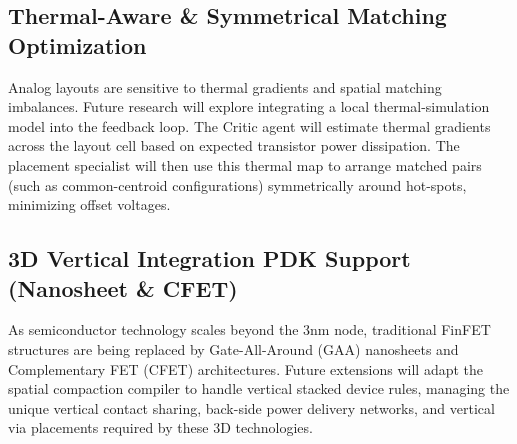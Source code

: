 \subsection{Thermal-Aware \& Symmetrical Matching Optimization}
\noindent
Analog layouts are sensitive to thermal gradients and spatial matching imbalances. Future research will explore integrating a local thermal-simulation model into the feedback loop. The Critic agent will estimate thermal gradients across the layout cell based on expected transistor power dissipation. The placement specialist will then use this thermal map to arrange matched pairs (such as common-centroid configurations) symmetrically around hot-spots, minimizing offset voltages.

\subsection{3D Vertical Integration PDK Support (Nanosheet \& CFET)}
\noindent
As semiconductor technology scales beyond the 3nm node, traditional FinFET structures are being replaced by Gate-All-Around (GAA) nanosheets and Complementary FET (CFET) architectures. Future extensions will adapt the spatial compaction compiler to handle vertical stacked device rules, managing the unique vertical contact sharing, back-side power delivery networks, and vertical via placements required by these 3D technologies.


